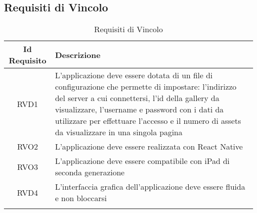 \subsection{Requisiti di Vincolo}
\normalsize
\begin{longtable}{|c|m{10cm}|}
\hline
\textbf{Id Requisito} & \textbf{Descrizione} \\
\hline
\endhead
RVD1 & L'applicazione deve essere dotata di un file di configurazione che permette di impostare: l'indirizzo del server a cui connettersi, l'id della gallery da visualizzare, l'username e password con i dati da utilizzare per effettuare l'accesso e il numero di assets da visualizzare in una singola pagina \\ \hline
RVO2 & L'applicazione deve essere realizzata con React Native \\ \hline
RVO3 & L'applicazione deve essere compatibile con iPad di seconda generazione \\ \hline
RVD4 & L'interfaccia grafica dell'applicazione deve essere fluida e non bloccarsi \\ \hline
\caption[Requisiti di Vincolo]{Requisiti di Vincolo}
\label{tabella:req1}
\end{longtable}

